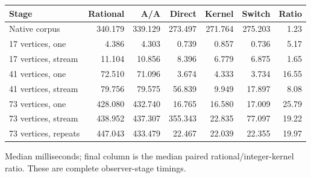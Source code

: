 \begin{center}\small
\begin{tabular}{@{}lrrrrrr@{}}
\toprule
Stage & Rational & A/A & Direct & Kernel & Switch & Ratio \\
\midrule
Native corpus & 340.179 & 339.129 & 273.497 & 271.764 & 275.203 & 1.23 \\
17 vertices, one & 4.386 & 4.303 & 0.739 & 0.857 & 0.736 & 5.17 \\
17 vertices, stream & 11.104 & 10.856 & 8.396 & 6.779 & 6.875 & 1.65 \\
41 vertices, one & 72.510 & 71.096 & 3.674 & 4.333 & 3.734 & 16.55 \\
41 vertices, stream & 79.756 & 79.575 & 56.839 & 9.949 & 17.897 & 8.08 \\
73 vertices, one & 428.080 & 432.740 & 16.765 & 16.580 & 17.009 & 25.79 \\
73 vertices, stream & 438.952 & 437.307 & 355.343 & 22.835 & 77.097 & 19.22 \\
73 vertices, repeats & 447.043 & 433.479 & 22.467 & 22.039 & 22.355 & 19.97 \\
\bottomrule
\end{tabular}
\end{center}
Median milliseconds; final column is the median paired rational/integer-kernel ratio. These are complete observer-stage timings.
